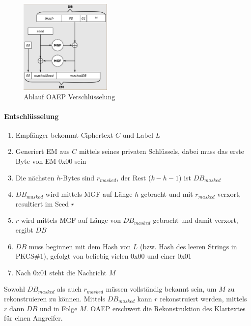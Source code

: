 \begin{figure}[h]
    \includegraphics[width=0.4\textwidth]{figures/fig8-oaep}
    \centering
    \caption{Ablauf OAEP Verschlüsselung}
\end{figure}

\paragraph{Entschlüsselung}

\begin{enumerate}
    \item Empfänger bekommt Ciphertext $C$ und Label $L$
    \item Generiert EM aus $C$ mittels seines privaten Schlüssels, dabei muss das erste Byte von EM 0x00 sein
    \item Die nächsten $h$-Bytes sind $r_{masked}$, der Rest ($k - h - 1$) ist $DB_{masked}$
    \item $DB_{masked}$ wird mittels MGF auf Länge $h$ gebracht und mit $r_{masked}$ verxort, resultiert im Seed $r$
    \item $r$ wird mittels MGF auf Länge von $DB_{masked}$ gebracht und damit verxort, ergibt $DB$
    \item $DB$ muss beginnen mit dem Hash von $L$ (bzw. Hash des leeren Strings in PKCS\#1), gefolgt von beliebig vielen 0x00 und einer 0x01
    \item Nach 0x01 steht die Nachricht $M$
\end{enumerate}

Sowohl $DB_{masked}$ als auch $r_{masked}$ müssen vollständig bekannt sein, um $M$ zu rekonstruieren zu können. Mittels $DB_{masked}$ kann $r$ rekonstruiert werden, 
mittels $r$ dann $DB$ und in Folge $M$.
OAEP erschwert die Rekonstruktion des Klartextes für einen Angreifer. \\

